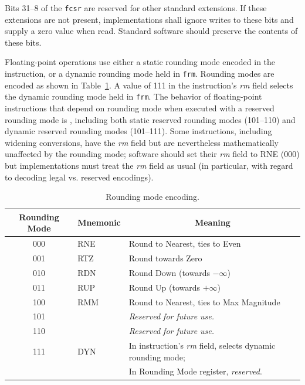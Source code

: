Bits 31--8 of the {\tt fcsr} are reserved for other standard extensions. If
these extensions are not present, implementations shall ignore writes to
these bits and supply a zero value when read.  Standard software should
preserve the contents of these bits.

Floating-point operations use either a static rounding mode encoded in
the instruction, or a dynamic rounding mode held in {\tt frm}.
Rounding modes are encoded as shown in Table~\ref{rm}.  A value of 111
in the instruction's {\em rm} field selects the dynamic rounding mode
held in {\tt frm}.  The behavior of floating-point instructions that
depend on rounding mode when executed with a reserved rounding mode is
\unspecified, including both static reserved rounding modes (101--110) and
dynamic reserved rounding modes (101--111).  Some instructions, including
widening conversions, have the {\em rm} field but are nevertheless
mathematically unaffected by the rounding mode; software should set their
{\em rm} field to RNE (000) but implementations must treat the {\em rm}
field as usual (in particular, with regard to decoding legal vs. reserved
encodings).

\begin{table}[htp]
\begin{small}
\begin{center}
\begin{tabular}{ccl}
\hline
\multicolumn{1}{|c|}{Rounding Mode} &
\multicolumn{1}{c|}{Mnemonic} &
\multicolumn{1}{c|}{Meaning} \\
\hline
\multicolumn{1}{|c|}{000} &
\multicolumn{1}{l|}{RNE} &
\multicolumn{1}{l|}{Round to Nearest, ties to Even}\\
\hline
\multicolumn{1}{|c|}{001} &
\multicolumn{1}{l|}{RTZ} &
\multicolumn{1}{l|}{Round towards Zero}\\
\hline
\multicolumn{1}{|c|}{010} &
\multicolumn{1}{l|}{RDN} &
\multicolumn{1}{l|}{Round Down (towards $-\infty$)}\\
\hline
\multicolumn{1}{|c|}{011} &
\multicolumn{1}{l|}{RUP} &
\multicolumn{1}{l|}{Round Up (towards $+\infty$)}\\
\hline
\multicolumn{1}{|c|}{100} &
\multicolumn{1}{l|}{RMM} &
\multicolumn{1}{l|}{Round to Nearest, ties to Max Magnitude}\\
\hline
\multicolumn{1}{|c|}{101} &
\multicolumn{1}{l|}{} &
\multicolumn{1}{l|}{\em Reserved for future use.}\\
\hline
\multicolumn{1}{|c|}{110} &
\multicolumn{1}{l|}{} &
\multicolumn{1}{l|}{\em Reserved for future use.}\\
\hline
\multicolumn{1}{|c|}{111} &
\multicolumn{1}{l|}{DYN} &
\multicolumn{1}{l|}{In instruction's {\em rm} field, selects dynamic rounding mode;}\\
\multicolumn{1}{|c|}{} &
\multicolumn{1}{l|}{} &
\multicolumn{1}{l|}{In Rounding Mode register, {\em reserved}.}\\
\hline
\end{tabular}
\end{center}
\end{small}
\caption{Rounding mode encoding.}
\label{rm}
\end{table}


